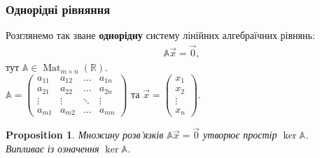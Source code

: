 \documentclass[a4paper, 10pt]{article}
\theoremstyle{theoremdd}
\newtheorem{proposition}[theorem]{Proposition}
\DeclareMathOperator{\Mat}{Mat}
\begin{document}
\subsubsection{Однорідні рівняння}
Розглянемо так зване \textbf{однорідну} систему лінійних алгебраїчних рівнянь:
\begin{align*}
\mathbb{A} \vec{x} = \vec{0},
\end{align*}
тут $\mathbb{A} \in \Mat_{m \times n}(\mathbb{R})$.\\
$\mathbb{A} = \begin{pmatrix}
a_{11} & a_{12} & \dots & a_{1n} \\
a_{21} & a_{22} & \dots & a_{2n} \\
\vdots & \vdots & \ddots & \vdots \\
a_{m1} & a_{m2} & \dots & a_{mn}
\end{pmatrix}$ та $\vec{x} = \begin{pmatrix}
x_1 \\ x_2 \\ \vdots \\ x_n
\end{pmatrix}$.

\begin{proposition}
Множину розв'язків $\mathbb{A} \vec{x} = \vec{0}$ утворює простір $\ker { \mathbb{A}}$.\\
\textit{Випливає із означення $\ker { \mathbb{A}}$.}
\end{proposition}
\end{document}
